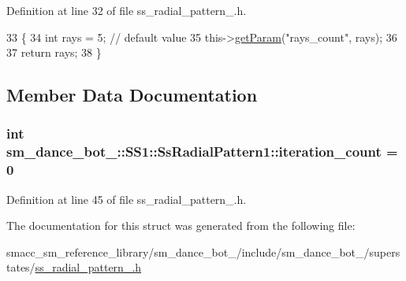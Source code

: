 Definition at line 32 of file ss\+\_\+radial\+\_\+pattern\+\_.\+h.


\begin{DoxyCode}
33     \{
34         \textcolor{keywordtype}{int} rays = 5; \textcolor{comment}{// default value}
35         this->\hyperlink{classsmacc_1_1ISmaccState_abbb3a24b912c6e8de28f7b86123b6357}{getParam}(\textcolor{stringliteral}{"rays\_count"}, rays);
36         
37         \textcolor{keywordflow}{return} rays;
38     \}
\end{DoxyCode}


\subsection{Member Data Documentation}
\subsubsection[{\texorpdfstring{iteration\+\_\+count}{iteration_count}}]{\setlength{\rightskip}{0pt plus 5cm}int sm\+\_\+dance\+\_\+bot\+\_\+::\+S\+S1\+::\+Ss\+Radial\+Pattern1\+::iteration\+\_\+count = 0}\hypertarget{structsm__dance__bot__2_1_1SS1_1_1SsRadialPattern1_a271a1f904960fed7e6a3fc8856ed0ed2}{}\label{structsm__dance__bot__2_1_1SS1_1_1SsRadialPattern1_a271a1f904960fed7e6a3fc8856ed0ed2}


Definition at line 45 of file ss\+\_\+radial\+\_\+pattern\+\_.\+h.



The documentation for this struct was generated from the following file\+:\begin{DoxyCompactItemize}
\item 
smacc\+\_\+sm\+\_\+reference\+\_\+library/sm\+\_\+dance\+\_\+bot\+\_/include/sm\+\_\+dance\+\_\+bot\+\_/superstates/\hyperlink{2_2include_2sm__dance__bot__2_2superstates_2ss__radial__pattern__1_8h}{ss\+\_\+radial\+\_\+pattern\+\_.\+h}\end{DoxyCompactItemize}

